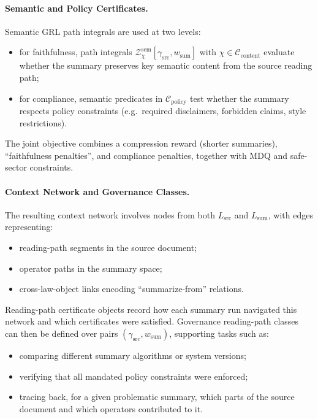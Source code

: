 \documentclass[11pt]{book}
\theoremstyle{plain}
\theoremstyle{definition}
\theoremstyle{remark}
\begin{document}
\paragraph{Semantic and Policy Certificates.}
Semantic GRL path integrals are used at two levels:
\begin{itemize}
  \item for faithfulness, path integrals
        $\mathcal{Z}^{\mathrm{sem}}_\chi[\gamma_{\mathrm{src}},
        w_{\mathrm{sum}}]$ with $\chi\in\mathcal{C}_{\mathrm{content}}$
        evaluate whether the summary preserves key semantic content
        from the source reading path;
  \item for compliance, semantic predicates in
        $\mathcal{C}_{\mathrm{policy}}$ test whether the summary
        respects policy constraints (e.g.\ required disclaimers,
        forbidden claims, style restrictions).
\end{itemize}
The joint objective combines a compression reward (shorter summaries),
``faithfulness penalties'', and compliance penalties, together with MDQ
and safe-sector constraints.

\paragraph{Context Network and Governance Classes.}
The resulting context network involves nodes from both $L_{\mathrm{src}}$
and $L_{\mathrm{sum}}$, with edges representing:
\begin{itemize}
  \item reading-path segments in the source document;
  \item operator paths in the summary space;
  \item cross-law-object links encoding ``summarize-from'' relations.
\end{itemize}
Reading-path certificate objects record how each summary run navigated
this network and which certificates were satisfied. Governance
reading-path classes can then be defined over pairs
$(\gamma_{\mathrm{src}},w_{\mathrm{sum}})$, supporting tasks such as:
\begin{itemize}
  \item comparing different summary algorithms or system versions;
  \item verifying that all mandated policy constraints were enforced;
  \item tracing back, for a given problematic summary, which parts of
        the source document and which operators contributed to it.
\end{itemize}
\end{document}

